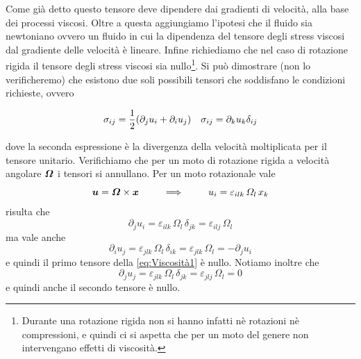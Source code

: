 Come già detto questo tensore deve dipendere dai gradienti di velocità, alla base dei processi viscosi. Oltre a questa aggiungiamo l'ipotesi che il fluido sia newtoniano ovvero un fluido in cui la dipendenza del tensore degli stress viscosi dal gradiente delle velocità è lineare. Infine richiediamo che nel caso di rotazione rigida il tensore degli stress viscosi sia nullo\footnote{Durante una rotazione rigida non si hanno infatti nè rotazioni nè compressioni, e quindi ci si aspetta che per un moto del genere non intervengano effetti di viscosità.}. Si può dimostrare (non lo verificheremo) che esistono due soli possibili tensori che soddisfano le condizioni richieste, ovvero
\begin{EQ}
\begin{align}
&\sigma_{ij} = \dfrac{1}{2}(\partial_j u_i + \partial_i u_j)
&\sigma_{ij} = \partial_k u_k \delta_{ij} \label{eq:Viscosità1}
\end{align}
\end{EQ}
dove la seconda espressione è la divergenza della velocità moltiplicata per il tensore unitario. Verifichiamo che per un moto di rotazione rigida a velocità angolare $\V{\Omega}$ i tensori si annullano. Per un moto rotazionale vale
\begin{equation}
\V{u} = \vett{\Omega}{x} \,\,\,\,\,\,\,\,\,\,\,\,\,\,\, \Longrightarrow  \,\,\,\,\,\,\,\,\,\,\,\,\,\,\, u_i = \varepsilon_{ilk}\, \Omega_l\, x_k
\end{equation}
risulta che
\begin{equation}
\partial_j u_i = \varepsilon_{ilk}\, \Omega_l\, \delta_{jk} = \varepsilon_{ilj} \, \Omega_l
\end{equation}
ma vale anche
\begin{equation}
\partial_i u_j = \varepsilon_{jlk}\, \Omega_l\, \delta_{ik} = \varepsilon_{jlk} \, \Omega_l = -\partial_j u_i
\end{equation}
e quindi il primo tensore della \ref{eq:Viscosità1} è nullo. Notiamo inoltre che
\begin{equation}
\partial_j u_j = \varepsilon_{jlk}\,\Omega_l \,\delta_{jk} = \varepsilon_{jlj}\, \Omega_l = 0
\end{equation}
e quindi anche il secondo tensore è nullo.

